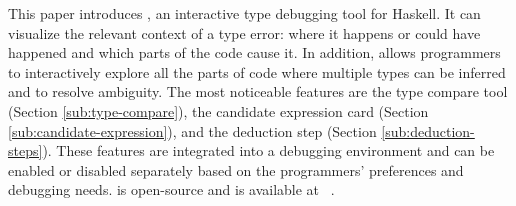 This paper introduces \chameleon{}, an interactive type debugging tool for Haskell. It can visualize the relevant context of a type error: where it happens or could have happened and which parts of the code cause it. In addition, \chameleon{} allows programmers to interactively explore all the parts of code where multiple types can be inferred and to resolve ambiguity. The most noticeable features are the type compare tool (Section \ref{sub:type-compare}), the candidate expression card (Section \ref{sub:candidate-expression}), and the deduction step (Section \ref{sub:deduction-steps}). These features are integrated into a debugging environment and can be enabled or disabled separately based on the programmers' preferences and debugging needs. \chameleon{} is open-source and is available at ~\cite{Anonymous2022-xp}.  




